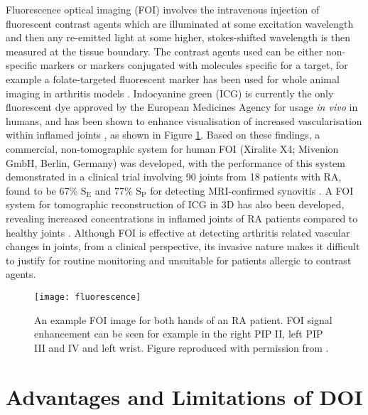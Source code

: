 \documentclass[twoside]{bhamthesis}
\theoremstyle{definition}
\begin{document}
Fluorescence optical imaging (FOI) involves the intravenous injection of fluorescent contrast agents which are illuminated at some excitation wavelength and then any re-emitted light at some higher, stokes-shifted wavelength is then measured at the tissue boundary. The contrast agents used can be either non-specific markers or markers conjugated with molecules specific for a target, for example a folate-targeted fluorescent marker has been used for whole animal imaging in arthritis models \cite{chen2005arthritis}. Indocyanine green (ICG) is currently the only fluorescent dye approved by the European Medicines Agency for usage \textit{in vivo} in humans, and has been shown to enhance visualisation of increased vascularisation within inflamed joints \cite{werner2012inflammation}, as shown in Figure \ref{fig:fluorescence}. Based on these findings, a commercial, non-tomographic system for human FOI (Xiralite X4; Mivenion GmbH, Berlin, Germany) was developed, with the performance of this system demonstrated in a clinical trial involving 90 joints from 18 patients with RA, found to be 67\% $\mathrm{S_E}$ and 77\% $\mathrm{S_P}$ for detecting MRI-confirmed synovitis \cite{schafer2013quantitative}. A FOI system for tomographic reconstruction of ICG in 3D has also been developed, revealing increased concentrations in inflamed joints of RA patients compared to healthy joints \cite{mohajerani2014fluorescence}. Although FOI is effective at detecting arthritis related vascular changes in joints, from a clinical perspective, its invasive nature makes it difficult to justify for routine monitoring and unsuitable for patients allergic to contrast agents.

\begin{figure}[!ht]
\centering\texttt{[image: fluorescence]}\caption{An example FOI image  for both hands of an RA patient. FOI signal enhancement can be seen for example in the right PIP II, left PIP III and IV and left wrist. Figure reproduced with permission from \cite{werner2012inflammation}.}
  \label{fig:fluorescence}
\end{figure}

\section{Advantages and Limitations of DOI}
\end{document}
